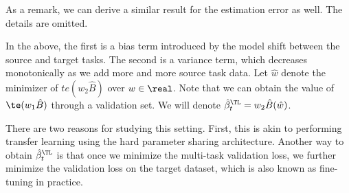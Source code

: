 As a remark, we can derive a similar result for the estimation error as well. The details are omitted.


In the above, the first is a bias term introduced by the model shift between the source and target tasks.
The second is a variance term, which decreases monotonically as we add more and more source task data.
Let $\hat{w}$ denote the minimizer of $te(w_2 \hat{B})$ over $w\in\real$.
Note that we can obtain the value of $\te(w_1\hat{B})$ through a validation set.
We will denote $\hat{\beta}_t^{\TL} = w_2 \hat{B}(\hat{w})$.

There are two reasons for studying this setting.
First, this is akin to performing transfer learning using the hard parameter sharing architecture.
Another way to obtain $\hat{\beta}_t^{\TL}$ is that once we minimize the multi-task validation loss, we further minimize the validation loss on the target dataset, which is also known as fine-tuning in practice.



